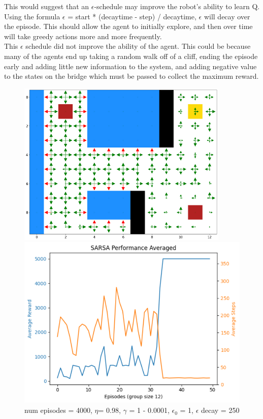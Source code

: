\documentclass[12pt]{article}
\begin{document}
This would suggest that an $\epsilon$-schedule may improve the robot’s ability to learn Q. Using the formula $\epsilon$ = start * (decaytime - step) / decaytime, $\epsilon$ will decay over the episode. This should allow the agent to initially explore, and then over time will take greedy actions more and more frequently.
\\

This $\epsilon$ schedule did not improve the ability of the agent. This could be because many of the agents end up taking a random walk off of a cliff, ending the episode early and adding little new information to the system, and adding negative value to the states on the bridge which must be passed to collect the maximum reward. 
\\
\begin{figure}
  \centering
\begin{minipage}{.28\textwidth}
  \includegraphics[width=0.9\textwidth]{11 Q plot.png}
  \caption{  num episodes = 4000, $\eta$= 0.98, $\gamma$ = 1 - 0.0001, $\epsilon_0$ = 1, $\epsilon$ decay = 250 }
\end{minipage}%
\begin{minipage}{.32\textwidth}
  \centering
  \includegraphics[width=1\textwidth]{10 performance plot.png}
\end{minipage}
\end{figure}
\end{document}
